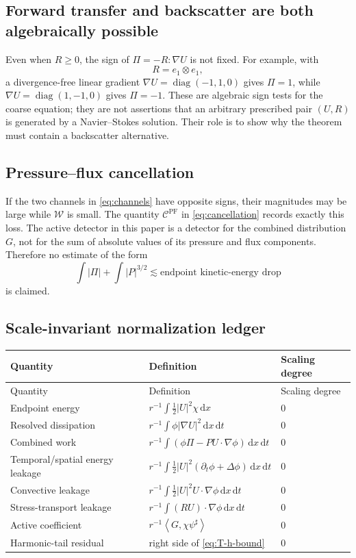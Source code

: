 \documentclass[11pt]{article}
\numberwithin{equation}{section}
\newcommand{\dx}{\,\mathrm dx}
\newcommand{\dxdt}{\,\mathrm dx\,\mathrm dt}
\newcommand{\pair}[2]{\left\langle #1,#2\right\rangle}
\newcommand{\W}{\mathcal W}
\newcommand{\Cpf}{\mathcal C^{\mathrm{PF}}}
\begin{document}
\subsection{Forward transfer and backscatter are both algebraically possible}

Even when \(R\ge0\), the sign of \(\Pi=-R:\nabla U\) is not fixed. For example, with
\[
R=e_1\otimes e_1,
\]
a divergence-free linear gradient \(\nabla U=\operatorname{diag}(-1,1,0)\) gives \(\Pi=1\), while \(\nabla U=\operatorname{diag}(1,-1,0)\) gives \(\Pi=-1\). These are algebraic sign tests for the coarse equation; they are not assertions that an arbitrary prescribed pair \((U,R)\) is generated by a Navier--Stokes solution. Their role is to show why the theorem must contain a backscatter alternative.

\subsection{Pressure--flux cancellation}

If the two channels in \eqref{eq:channels} have opposite signs, their magnitudes may be large while \(\W\) is small. The quantity \(\Cpf\) in \eqref{eq:cancellation} records exactly this loss. The active detector in this paper is a detector for the combined distribution \(G\), not for the sum of absolute values of its pressure and flux components. Therefore no estimate of the form
\[
\int|\Pi|+\int|P|^{3/2}
\lesssim
\text{endpoint kinetic-energy drop}
\]
is claimed.

\subsection{Scale-invariant normalization ledger}

\begin{longtable}{>{\raggedright\arraybackslash}p{}
                  >{\raggedright\arraybackslash}p{}
                  >{\centering\arraybackslash}p{}}
\toprule
Quantity & Definition & Scaling degree \\
\midrule
\endfirsthead
\toprule
Quantity & Definition & Scaling degree \\
\midrule
\endhead
Endpoint energy
& \(r^{-1}\int\frac12|U|^2\chi\dx\)
& \(0\) \\
Resolved dissipation
& \(r^{-1}\int\phi|\nabla U|^2\dxdt\)
& \(0\) \\
Combined work
& \(r^{-1}\int(\phi\Pi-PU\cdot\nabla\phi)\dxdt\)
& \(0\) \\
Temporal/spatial energy leakage
& \(r^{-1}\int\frac12|U|^2(\partial_t\phi+\Delta\phi)\dxdt\)
& \(0\) \\
Convective leakage
& \(r^{-1}\int\frac12|U|^2U\cdot\nabla\phi\dxdt\)
& \(0\) \\
Stress-transport leakage
& \(r^{-1}\int(RU)\cdot\nabla\phi\dxdt\)
& \(0\) \\
Active coefficient
& \(r^{-1}\pair{G}{\chi\psi^\sharp}\)
& \(0\) \\
Harmonic-tail residual
& right side of \eqref{eq:T-h-bound}
& \(0\) \\
\bottomrule
\end{longtable}
\end{document}
